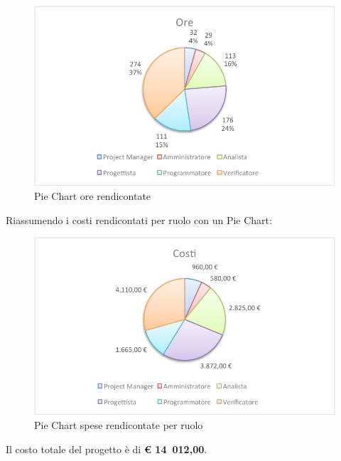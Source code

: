 			\begin{figure}[H]\centering
				\includegraphics[width=\textwidth]{PianoDiProgetto/Pics/ChartTotOreRendic.pdf}
				\caption{Pie Chart ore rendicontate}
			\end{figure}
			Riassumendo i costi rendicontati per ruolo con un Pie Chart:
			\begin{figure}[H]\centering
				\includegraphics[width=\textwidth]{PianoDiProgetto/Pics/ChartTotCostiRendic.pdf}
				\caption{Pie Chart spese rendicontate per ruolo}
			\end{figure}
		Il costo totale del progetto è di \textbf{\euro{} 14~012,00}.
